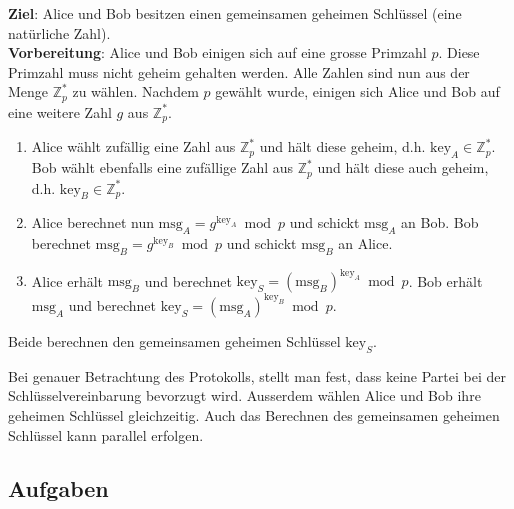 \begin{definition}
\textbf{Ziel}: Alice und Bob besitzen einen gemeinsamen geheimen Schlüssel (eine natürliche Zahl). \\ \textbf{Vorbereitung}: Alice und Bob einigen sich auf eine grosse Primzahl $p$. Diese Primzahl muss nicht geheim gehalten werden. Alle Zahlen sind nun aus der Menge $\mathbb{Z}_{p}^*$ zu wählen. Nachdem $p$ gewählt wurde, einigen sich Alice und Bob auf eine weitere Zahl $g$ aus $\mathbb{Z}_{p}^*$.


\begin{enumerate}
	\item Alice wählt zufällig eine Zahl aus $\mathbb{Z}_{p}^*$ und hält diese geheim, d.h. $\text{key}_A \in \mathbb{Z}_{p}^*$. Bob wählt ebenfalls eine zufällige Zahl aus $\mathbb{Z}_{p}^*$ und hält diese auch geheim, d.h. $\text{key}_B \in \mathbb{Z}_{p}^*$.
	\item Alice berechnet nun $\text{msg}_A = g^{\text{key}_A} \bmod p$ und schickt $\text{msg}_A$ an Bob. Bob berechnet $\text{msg}_B = g^{\text{key}_B} \bmod p$ und schickt $\text{msg}_B$ an Alice.
	\item Alice erhält $\text{msg}_B$ und berechnet $\text{key}_S = (\text{msg}_B)^{\text{key}_A} \bmod p$. Bob erhält $\text{msg}_A$ und berechnet $\text{key}_S = (\text{msg}_A)^{\text{key}_B} \bmod p$.
\end{enumerate}

Beide berechnen den gemeinsamen geheimen Schlüssel $\text{key}_S$.

\end{definition}

Bei genauer Betrachtung des Protokolls, stellt man fest, dass keine Partei bei der Schlüsselvereinbarung bevorzugt wird. Ausserdem wählen Alice und Bob ihre geheimen Schlüssel gleichzeitig. Auch das Berechnen des gemeinsamen geheimen Schlüssel kann parallel erfolgen.

\subsection{Aufgaben}

